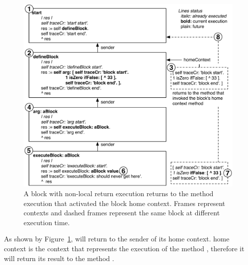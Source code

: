 \documentclass[a4paper,10pt,twoside]{book}
\begin{document}
\begin{figure}
\begin{center}\includegraphics[width=\textwidth]{nonLocalReturn2}
\caption{A block with non-local return execution returns to the method execution that activated the block home context. Frames represent contexts and dashed frames represent the same block at different execution time.\label{nonLocalReturn}}
\end{center}
\end{figure}

As shown by Figure~\ref{nonLocalReturn}, \ct{[^33]} will return to the sender of its home context. \ct{[^33]} home context is the context that represents the execution of the method , therefore it will return its result to the method .
\end{document}
